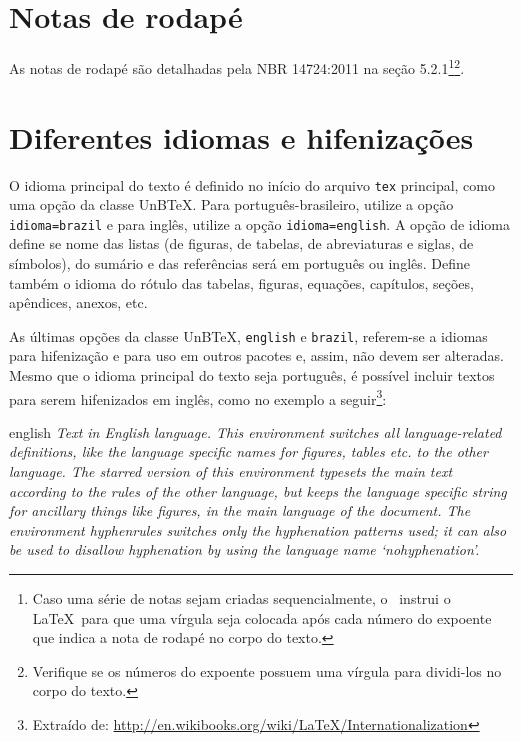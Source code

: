 \section{Notas de rodapé}

As notas de rodapé são detalhadas pela NBR 14724:2011 na seção 5.2.1\footnote{Caso uma série de notas sejam criadas sequencialmente, o \abnTeX\ instrui o \LaTeX\ para que uma vírgula seja colocada após cada número do expoente que indica a nota de rodapé no corpo do texto.}\footnote{Verifique se os números do expoente possuem uma vírgula para dividi-los no corpo do texto.}.

\section{Diferentes idiomas e hifenizações}
\label{sec:hifenizacao}

O idioma principal do texto é definido no início do arquivo \texttt{tex} principal, como uma opção da classe UnB\TeX. Para português-brasileiro, utilize a opção \texttt{idioma=brazil} e para inglês, utilize a opção \texttt{idioma=english}. A opção de idioma define se nome das listas (de figuras, de tabelas, de abreviaturas e siglas, de símbolos), do sumário e das referências será em português ou inglês. Define também o idioma do rótulo das tabelas, figuras, equações, capítulos, seções, apêndices, anexos, etc.

As últimas opções da classe UnB\TeX, \texttt{english} e \texttt{brazil}, referem-se a idiomas para hifenização e para uso em outros pacotes e, assim, não devem ser alteradas. Mesmo que o idioma principal do texto seja português, é possível incluir textos para serem hifenizados em inglês, como no exemplo a seguir\footnote{Extraído de: \url{http://en.wikibooks.org/wiki/LaTeX/Internationalization}}:

\begin{otherlanguage*}{english}
\textit{Text in English language. This environment switches all language-related definitions, like the language specific names for figures, tables etc. to the other language. The starred version of this environment typesets the main text according to the rules of the other language, but keeps the language specific string for ancillary things like figures, in the main language of the document. The environment hyphenrules switches only the hyphenation patterns used; it can also be used to disallow hyphenation by using the language name `nohyphenation'.}
\end{otherlanguage*}

